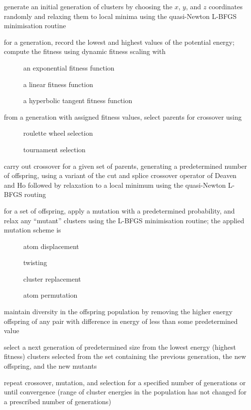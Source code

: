\begin{description}
  \item[] generate an initial generation of clusters by choosing the $x$, $y$, and $z$ coordinates
    randomly and relaxing them to local minima using the quasi-Newton L-BFGS minimisation routine
  \item for a generation, record the lowest and highest values of the potential energy; compute the fitness 
    using dynamic fitness scaling with
    \begin{description}
      \item[] an exponential fitness function
      \item[] a linear fitness function
      \item[] a hyperbolic tangent fitness function
    \end{description}
  \item from a generation with assigned fitness values, select parents for crossover using
    \begin{description}
      \item[] roulette wheel selection
      \item[] tournament selection
    \end{description}
  \item[\req{4}] carry out crossover for a given set of parents, generating a predetermined number of offspring, 
    using a variant of the cut and splice crossover operator of Deaven and Ho followed by relaxation to a local
    minimum using the quasi-Newton L-BFGS routing
  \item for a set of offspring, apply a mutation with a predetermined probability, and relax any ``mutant'' clusters
    using the L-BFGS minimisation routine; the applied mutation scheme is
    \begin{description}
      \item[] atom displacement
      \item[] twisting
      \item[] cluster replacement
      \item[] atom permutation
    \end{description}
  \item[\req{6}] maintain diversity in the offspring population by removing the higher energy offspring of any pair with
    difference in energy of less than some predetermined value
  \item[\req{7}] select a next generation of predetermined size from the lowest energy (highest fitness) 
    clusters selected from the set containing the previous generation, the new offspring, and the new mutants
  \item[\req{8}] repeat crossover, mutation, and selection for a specified number of generations or until convergence
    (range of cluster energies in the population has not changed for a prescribed number of generations)
\end{description}
